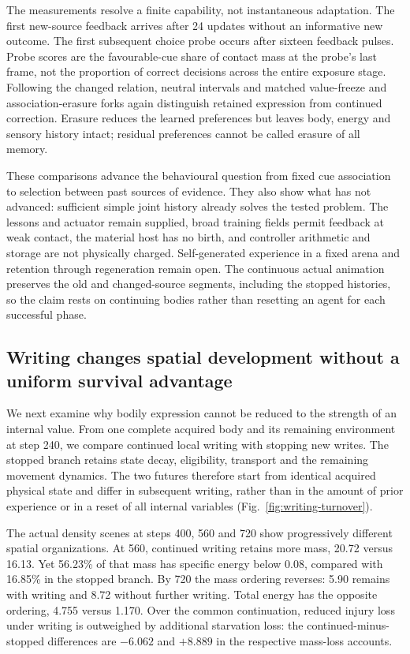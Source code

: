 The measurements resolve a finite capability, not instantaneous adaptation. The first new-source feedback arrives after 24 updates without an informative new outcome. The first subsequent choice probe occurs after sixteen feedback pulses. Probe scores are the favourable-cue share of contact mass at the probe's last frame, not the proportion of correct decisions across the entire exposure stage. Following the changed relation, neutral intervals and matched value-freeze and association-erasure forks again distinguish retained expression from continued correction. Erasure reduces the learned preferences but leaves body, energy and sensory history intact; residual preferences cannot be called erasure of all memory.

These comparisons advance the behavioural question from fixed cue association to selection between past sources of evidence. They also show what has not advanced: sufficient simple joint history already solves the tested problem. The lessons and actuator remain supplied, broad training fields permit feedback at weak contact, the material host has no birth, and controller arithmetic and storage are not physically charged. Self-generated experience in a fixed arena and retention through regeneration remain open. The continuous actual animation preserves the old and changed-source segments, including the stopped histories, so the claim rests on continuing bodies rather than resetting an agent for each successful phase.







\subsection*{Writing changes spatial development without a uniform survival advantage}

We next examine why bodily expression cannot be reduced to the strength of an internal value. From one complete acquired body and its remaining environment at step 240, we compare continued local writing with stopping new writes. The stopped branch retains state decay, eligibility, transport and the remaining movement dynamics. The two futures therefore start from identical acquired physical state and differ in subsequent writing, rather than in the amount of prior experience or in a reset of all internal variables (Fig.~\ref{fig:writing-turnover}).

The actual density scenes at steps 400, 560 and 720 show progressively different spatial organizations. At 560, continued writing retains more mass, 20.72 versus 16.13. Yet 56.23\% of that mass has specific energy below $0.08$, compared with 16.85\% in the stopped branch. By 720 the mass ordering reverses: 5.90 remains with writing and 8.72 without further writing. Total energy has the opposite ordering, 4.755 versus 1.170. Over the common continuation, reduced injury loss under writing is outweighed by additional starvation loss: the continued-minus-stopped differences are $-6.062$ and $+8.889$ in the respective mass-loss accounts.

